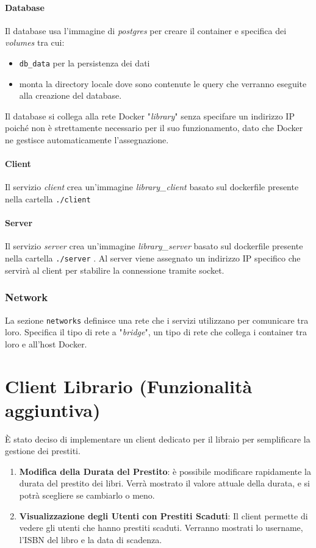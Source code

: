 \documentclass[]{report}
\begin{document}
\subsubsection*{Database}
Il database usa l'immagine di \textit{postgres} per creare il container e specifica dei \textit{volumes} tra cui:
\begin{itemize}
	\item \texttt{db\_data} per la persistenza dei dati
	\item monta la directory locale dove sono contenute le query che verranno eseguite alla creazione del database.
\end{itemize}
Il database si collega alla rete Docker "\textit{library}" senza specifare un indirizzo IP poiché non è strettamente necessario per il suo funzionamento, dato che Docker ne gestisce automaticamente l'assegnazione.

\subsubsection*{Client}
Il servizio \textit{client} crea un'immagine \textit{library\_client} basato sul dockerfile presente nella cartella \texttt{./client}

\subsubsection*{Server}
Il servizio \textit{server} crea un'immagine \textit{library\_server} basato sul dockerfile presente nella cartella \texttt{./server} .\sskip
Al server viene assegnato un indirizzo IP specifico che servirà al client per stabilire la connessione tramite socket.

\subsection{Network}
La sezione \texttt{networks} definisce una rete che i servizi utilizzano per comunicare tra loro.\sskip
Specifica il tipo di rete a "\textit{bridge}", un tipo di rete che collega i container tra loro e all'host Docker.

\chapter{Client Librario (Funzionalità aggiuntiva)}
È stato deciso di implementare un client dedicato per il libraio per semplificare la gestione dei prestiti.

\begin{enumerate}
	\item \textbf{Modifica della Durata del Prestito}:
	      è possibile modificare rapidamente la durata del prestito dei libri. Verrà mostrato il valore attuale della durata, e si potrà scegliere se cambiarlo o meno.

	\item \textbf{Visualizzazione degli Utenti con Prestiti Scaduti}:
	      Il client permette di vedere gli utenti che hanno prestiti scaduti. Verranno mostrati lo username, l'ISBN del libro e la data di scadenza.
\end{enumerate}
\end{document}
